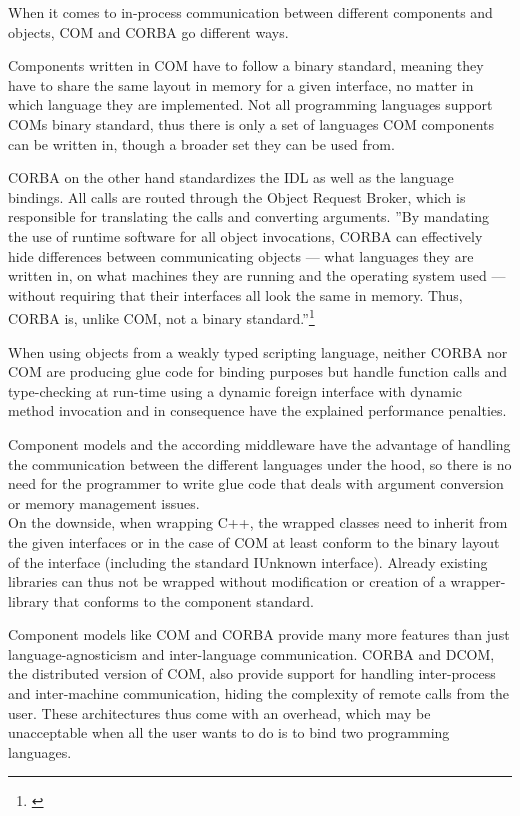 When it comes to in-process communication between different components and objects, COM and CORBA go different ways. 

Components written in COM have to follow a binary standard, meaning they have to share the same layout in memory for a given interface, no matter in which language they are implemented. Not all programming languages support COMs binary standard, thus there is only a set of languages COM components can be written in, though a broader set they can be used from.

CORBA on the other hand standardizes the IDL as well as the language bindings. All calls are routed through the Object Request Broker, which is responsible for translating the calls and converting arguments. ''By mandating the use of runtime software for all object invocations, CORBA can effectively hide differences between communicating objects — what languages they are written in, on what machines they are running and the operating system used — without requiring that their interfaces all look the same in memory. Thus, CORBA is, unlike COM, not a binary standard.''\footnote{\citep[83]{ComponentTechnology}}

When using objects from a weakly typed scripting language, neither CORBA nor COM are producing glue code for binding purposes but handle function calls and type-checking at run-time using a dynamic foreign interface with dynamic method invocation and in consequence have the explained performance penalties.

Component models and the according middleware have the advantage of handling the communication between the different languages under the hood, so there is no need for the programmer to write glue code that deals with argument conversion or memory management issues.\\
On the downside, when wrapping C++, the wrapped classes need to inherit from the given interfaces or in the case of COM at least conform to the binary layout of the interface (including the standard IUnknown interface). Already existing libraries can thus not be wrapped without modification or creation of a wrapper-library that conforms to the component standard.


Component models like COM and CORBA provide many more features than just language-agnosticism and inter-language communication. CORBA and DCOM, the distributed version of COM, also provide support for handling inter-process and inter-machine communication, hiding the complexity of remote calls from the user. These architectures thus come with an overhead, which may be unacceptable when all the user wants to do is to bind two programming languages.


